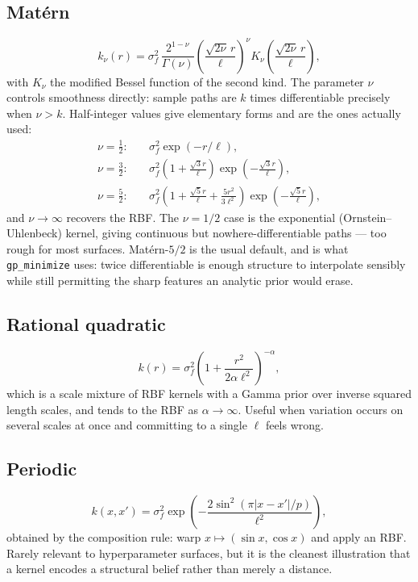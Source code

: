 \documentclass[conference]{IEEEtran}
\begin{document}
\subsection*{Mat\'ern}
\begin{equation}
    k_\nu(r) = \sigma_f^2\,\frac{2^{1-\nu}}{\Gamma(\nu)}
    \left(\frac{\sqrt{2\nu}\,r}{\ell}\right)^{\!\nu}
    K_\nu\!\left(\frac{\sqrt{2\nu}\,r}{\ell}\right),
\end{equation}
with $K_\nu$ the modified Bessel function of the second kind. The parameter $\nu$ controls smoothness directly: sample paths are $k$ times differentiable precisely when $\nu > k$. Half-integer values give elementary forms and are the ones actually used:
\begin{align}
    \nu = \tfrac{1}{2}: \quad & \sigma_f^2 \exp(-r/\ell), \\
    \nu = \tfrac{3}{2}: \quad & \sigma_f^2\left(1 + \tfrac{\sqrt{3}r}{\ell}\right)\exp\!\left(-\tfrac{\sqrt{3}r}{\ell}\right), \\
    \nu = \tfrac{5}{2}: \quad & \sigma_f^2\left(1 + \tfrac{\sqrt{5}r}{\ell} + \tfrac{5r^2}{3\ell^2}\right)\exp\!\left(-\tfrac{\sqrt{5}r}{\ell}\right),
\end{align}
and $\nu \to \infty$ recovers the RBF. The $\nu = 1/2$ case is the exponential (Ornstein--Uhlenbeck) kernel, giving continuous but nowhere-differentiable paths --- too rough for most surfaces. Mat\'ern-$5/2$ is the usual default, and is what \texttt{gp\_minimize} uses: twice differentiable is enough structure to interpolate sensibly while still permitting the sharp features an analytic prior would erase.

\subsection*{Rational quadratic}
\begin{equation}
    k(r) = \sigma_f^2\left(1 + \frac{r^2}{2\alpha\ell^2}\right)^{-\alpha},
\end{equation}
which is a scale mixture of RBF kernels with a Gamma prior over inverse squared length scales, and tends to the RBF as $\alpha \to \infty$. Useful when variation occurs on several scales at once and committing to a single $\ell$ feels wrong.

\subsection*{Periodic}
\begin{equation}
    k(x,x') = \sigma_f^2 \exp\!\left(-\frac{2\sin^2\!\left(\pi|x-x'|/p\right)}{\ell^2}\right),
\end{equation}
obtained by the composition rule: warp $x \mapsto (\sin x, \cos x)$ and apply an RBF. Rarely relevant to hyperparameter surfaces, but it is the cleanest illustration that a kernel encodes a structural belief rather than merely a distance.
\end{document}
